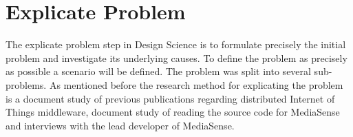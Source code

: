 \chapter{Explicate Problem}
The explicate problem step in Design Science \cite{johannesson2012design} is to formulate precisely the initial problem and investigate its underlying causes. To define the problem as precisely as possible a scenario will be defined. The problem was split into several sub-problems. As mentioned before the research method for explicating the problem is a document study of previous publications regarding distributed Internet of Things middleware, document study of reading the source code for MediaSense and interviews with the lead developer of MediaSense. 




